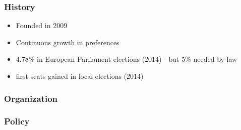 \begin{frame}
	\frametitle{History}
	\begin{itemize}
		\item Founded in 2009
		\item Continuous growth in preferences 
		\item 4.78\% in European Parliament elections (2014) - but 5\% needed by law
		\item first seats gained in local elections (2014)
	\end{itemize}
\end{frame}
\begin{frame}
	\frametitle{Organization}
\end{frame}
\begin{frame}
	\frametitle{Policy}
\end{frame}